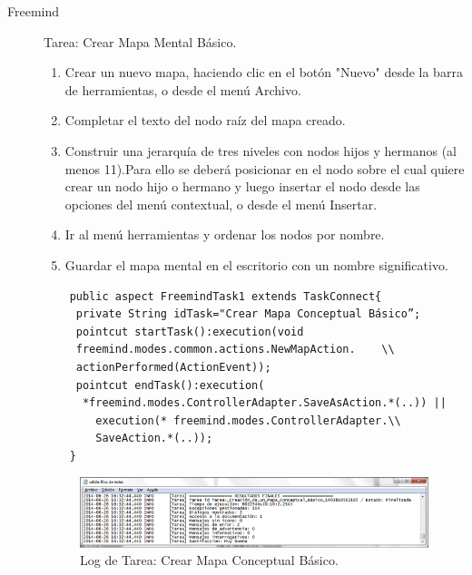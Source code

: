 \begin{description}
\item[Freemind]
Tarea: Crear Mapa Mental Básico.
	\begin{enumerate}
		\item Crear un nuevo mapa, haciendo clic en el botón "Nuevo" desde la barra de herramientas, o desde el menú Archivo. 
		\item Completar el texto del nodo raíz del mapa creado.
		\item Construir una jerarquía de tres niveles con nodos hijos y hermanos (al menos 11).Para ello se deberá posicionar en el nodo sobre el cual quiere crear un nodo hijo o hermano y luego insertar el nodo desde las opciones del menú contextual, o desde el menú Insertar.
		\item Ir al menú herramientas y ordenar los nodos por nombre.
		\item Guardar el mapa mental en el escritorio con un nombre significativo.
	\end{enumerate}
	\begin{verbatim}
	public aspect FreemindTask1 extends TaskConnect{
	 private String idTask="Crear Mapa Conceptual Básico”;
	 pointcut startTask():execution(void  
	 freemind.modes.common.actions.NewMapAction.	\\
	 actionPerformed(ActionEvent));
	 pointcut endTask():execution( 	 
	  *freemind.modes.ControllerAdapter.SaveAsAction.*(..)) ||
	    execution(* freemind.modes.ControllerAdapter.\\
	    SaveAction.*(..));
	}
	\end{verbatim}
	\begin{figure}[ht]
		\centering
		\includegraphics[scale=1]{figs/fig4.png}
		\caption{\label{fig:fig4} Log de Tarea: Crear Mapa Conceptual Básico.}
	\end{figure}


\end{description}
